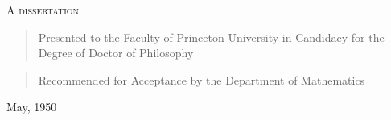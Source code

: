\begin{titlepage}
    \begin{center}
        \vspace*{1cm}
 
        \Large
        \textsc{A dissertation}
 
        \normalsize
        \vspace{0.2cm}
        \begin{quote}
        Presented to the Faculty of Princeton University in Candidacy for the Degree of Doctor of Philosophy
        \end{quote}

        \vspace{1.5cm}
 
        
 
        \vfill
  
 
        \begin{quote}
            Recommended for Acceptance by the Department of Mathematics
        \end{quote}
        May, 1950
        \vspace{0.5cm}
 
    \end{center}
\end{titlepage}
